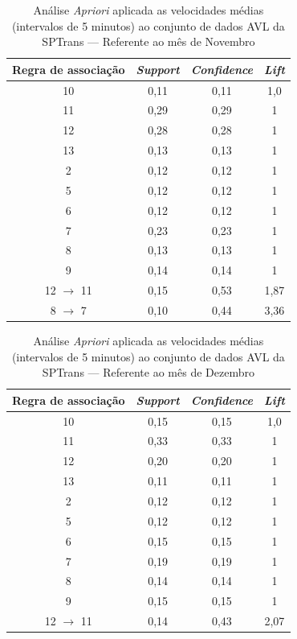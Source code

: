 \documentclass[
	12pt,				%
	oneside,			%
	a4paper,			%
	english,			%
	brazil				%
	]{abntex2ppgsi}
\begin{document}
{{\begin{apendicesenv}
\begin{table}[!htb]
\centering
\caption {Análise \textit{Apriori} aplicada as velocidades médias (intervalos de 5 minutos) ao conjunto de dados AVL da SPTrans --- Referente ao mês de Novembro}
\label {tab:aprioriNovember}
\begin{tabular}{c|c|c|c}
\toprule
\textbf{Regra de associação} & \textit{\textbf{Support}} & \textit{\textbf{Confidence}} & \textit{\textbf{Lift}} \\
\midrule
10 &  0,11 &  0,11 &  1,0\\
\hline
11 &  0,29 &  0,29 &  1\\
\hline
12 &  0,28 &  0,28 &  1\\
\hline
13 &  0,13 &  0,13 &  1\\
\hline
2 &  0,12 &  0,12 &  1\\
\hline
5 &  0,12 &  0,12 &  1\\
\hline
6 &  0,12 &  0,12 &  1\\
\hline
7 &  0,23 &  0,23 &  1\\
\hline
8 &  0,13 &  0,13 &  1\\
\hline
9 &  0,14 &  0,14 &  1\\
\hline
12 $\rightarrow$ 11 &  0,15 &  0,53 &  1,87\\
\hline
8 $\rightarrow$ 7 &  0,10 &  0,44 &  3,36\\
\bottomrule
\end{tabular}
\end{table}


\begin{table}[!htb]
\centering
\caption {Análise \textit{Apriori} aplicada as velocidades médias (intervalos de 5 minutos) ao conjunto de dados AVL da SPTrans --- Referente ao mês de Dezembro}
\label {tab:aprioriDecember}
\begin{tabular}{c|c|c|c}
\toprule
\textbf{Regra de associação} & \textit{\textbf{Support}} & \textit{\textbf{Confidence}} & \textit{\textbf{Lift}} \\
\midrule
10 &  0,15 &  0,15 &  1,0\\
\hline
11 &  0,33 &  0,33 &  1\\
\hline
12 &  0,20 &  0,20 &  1\\
\hline
13 &  0,11 &  0,11 &  1\\
\hline
2 &  0,12 &  0,12 &  1\\
\hline
5 &  0,12 &  0,12 &  1\\
\hline
6 &  0,15 &  0,15 &  1\\
\hline
7 &  0,19 &  0,19 &  1\\
\hline
8 &  0,14 &  0,14 &  1\\
\hline
9 &  0,15 &  0,15 &  1\\
\hline
12 $\rightarrow$ 11 &  0,14 &  0,43 &  2,07\\
\bottomrule
\end{tabular}
\end{table}


\end{apendicesenv}}}
\end{document}
